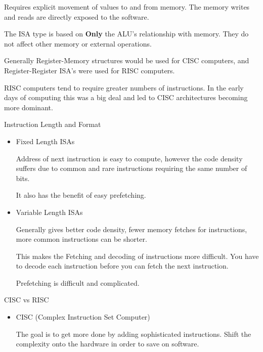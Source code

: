 \documentclass{report}
\begin{document}
\begin{description}
\begin{mdframed}
            Requires explicit movement of values to and from memory.
            The memory writes and reads are directly exposed to the
            software.
        \end{mdframed}
        
        The ISA type is based on \textbf{Only} the ALU's relationship
        with memory. They do not affect other memory or external operations.

        Generally Register-Memory structures would be used for CISC computers,
        and Register-Register ISA's were used for RISC computers.

        RISC computers tend to require greater numbers of instructions.
        In the early days of computing this was a big deal and led to
        CISC architectures becoming more dominant.


    \item Instruction Length and Format
        \begin{itemize}
            \item Fixed Length ISAs

                Address of next instruction is easy to compute, however
                the code density suffers due to common and rare instructions
                requiring the same number of bits.

                It also has the benefit of easy prefetching.
            \item Variable Length ISAs

                Generally gives better code density, fewer memory fetches for
                instructions, more common instructions can be shorter.

                This makes the Fetching and decoding of instructions more difficult.
                You have to decode each instruction before you can fetch the next
                instruction.

                Prefetching is difficult and complicated.
        \end{itemize}

    \item CISC vs RISC
        \begin{itemize}
            \item CISC (Complex Instruction Set Computer)

                The goal is to get more done by adding sophisticated instructions.
                Shift the complexity onto the hardware in order to save on software.


\end{itemize}
\end{description}
\end{document}

